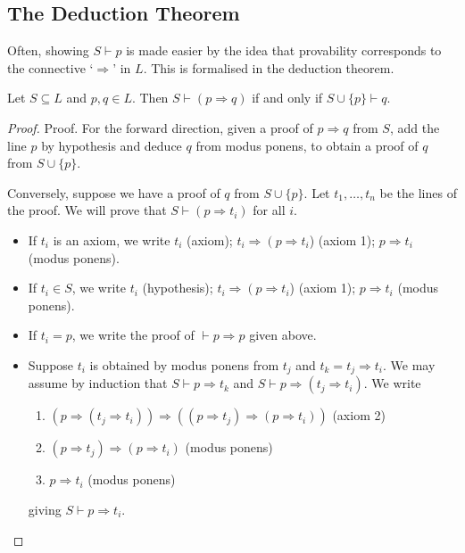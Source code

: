 \documentclass[a4paper]{scrartcl}
\begin{document}
\subsection{The Deduction Theorem}

Often, showing $S \vdash p$ is made easier by the idea that provability corresponds to the connective `$\Rightarrow$' in $L$. This is formalised in the deduction theorem.

\begin{theorem}
  Let $S \subseteq L$ and $p, q \in L$. Then $S \vdash (p \Rightarrow q)$ if and only if $S \cup \{p\} \vdash q$. 
\end{theorem}
\begin{proof}
  Proof. For the forward direction, given a proof of $p \Rightarrow q$ from $S$, add the line $p$ by hypothesis and deduce $q$ from modus ponens, to obtain a proof of $q$ from $S \cup\{p\}$.

Conversely, suppose we have a proof of $q$ from $S \cup\{p\}$. Let $t_1, \ldots, t_n$ be the lines of the proof. We will prove that $S \vdash\left(p \Rightarrow t_i\right)$ for all $i$.
\begin{itemize}
  \item If $t_i$ is an axiom, we write $t_i$ (axiom); $t_i \Rightarrow\left(p \Rightarrow t_i\right.$) (axiom 1); $p \Rightarrow t_i$ (modus ponens).
  \item If $t_i \in S$, we write $t_i$ (hypothesis); $t_i \Rightarrow\left(p \Rightarrow t_i\right.$) (axiom 1); $p \Rightarrow t_i$ (modus ponens).
  \item If $t_i=p$, we write the proof of $\vdash p \Rightarrow p$ given above.
  \item Suppose $t_i$ is obtained by modus ponens from $t_j$ and $t_k=t_j \Rightarrow t_i$. We may assume by induction that $S \vdash p \Rightarrow t_k$ and $S \vdash p \Rightarrow\left(t_j \Rightarrow t_i\right)$. We write
  \begin{enumerate}
    \item $\left(p \Rightarrow\left(t_j \Rightarrow t_i\right)\right) \Rightarrow\left(\left(p \Rightarrow t_j\right) \Rightarrow\left(p \Rightarrow t_i\right)\right)$ (axiom 2)
    \item $\left(p \Rightarrow t_j\right) \Rightarrow\left(p \Rightarrow t_i\right)$ (modus ponens)
    \item $p \Rightarrow t_i$ (modus ponens)
  \end{enumerate}
  giving $S \vdash p \Rightarrow t_i$.
\end{itemize}
\end{proof}
\end{document}
